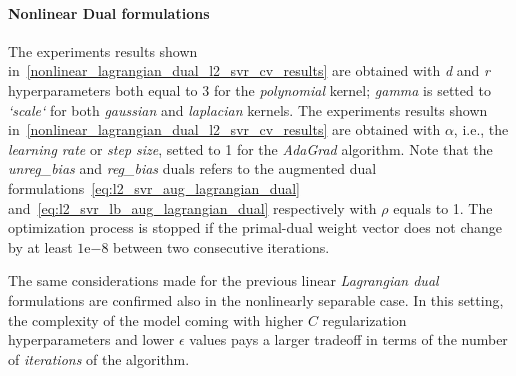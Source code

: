 \paragraph{Nonlinear Dual formulations}

The experiments results shown in~\ref{nonlinear_lagrangian_dual_l2_svr_cv_results} are obtained with \emph{d} and \emph{r} hyperparameters both equal to 3 for the \emph{polynomial} kernel; \emph{gamma} is setted to \emph{`scale`} for both \emph{gaussian} and \emph{laplacian} kernels. The experiments results shown in~\ref{nonlinear_lagrangian_dual_l2_svr_cv_results} are obtained with $\alpha$, i.e., the \emph{learning rate} or \emph{step size}, setted to 1 for the \emph{AdaGrad} algorithm. Note that the \emph{unreg\_bias} and \emph{reg\_bias} duals refers to the augmented dual formulations~\eqref{eq:l2_svr_aug_lagrangian_dual} and~\eqref{eq:l2_svr_lb_aug_lagrangian_dual} respectively with $\rho$ equals to 1. The optimization process is stopped if the primal-dual weight vector does not change by at least $1\mathrm{e}{-8}$  between two consecutive iterations.



The same considerations made for the previous linear \emph{Lagrangian dual} formulations are confirmed also in the nonlinearly separable case. In this setting, the complexity of the model coming with higher $C$ regularization hyperparameters and lower $\epsilon$ values pays a larger tradeoff in terms of the number of \emph{iterations} of the algorithm.

